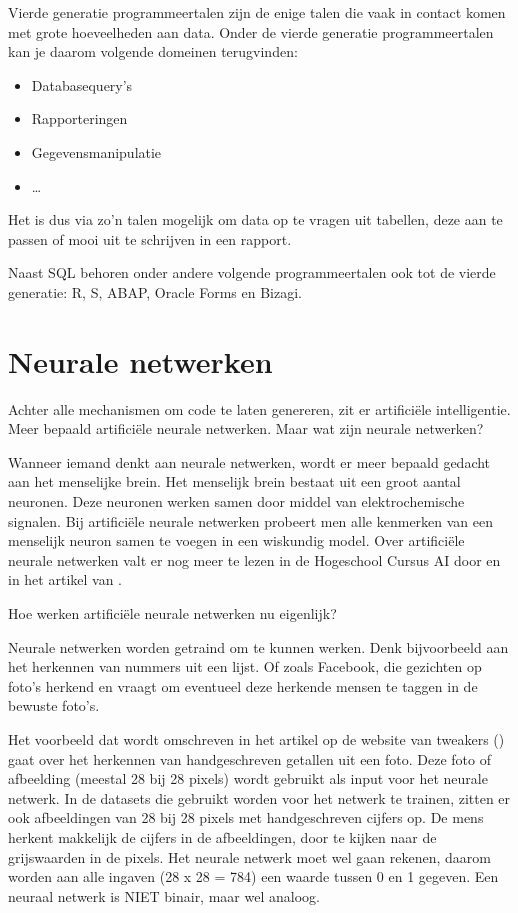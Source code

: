 Vierde generatie programmeertalen zijn de enige talen die vaak in contact komen met grote hoeveelheden aan data. Onder de vierde generatie programmeertalen kan je daarom volgende domeinen terugvinden:

\begin{itemize}
	\item Databasequery’s
	\item Rapporteringen
	\item Gegevensmanipulatie
	\item \dots
\end{itemize}

Het is dus via zo’n talen mogelijk om data op te vragen uit tabellen, deze aan te passen of mooi uit te schrijven in een rapport.

Naast SQL behoren onder andere volgende programmeertalen ook tot de vierde generatie: R, S, ABAP, Oracle Forms en Bizagi.

\section{Neurale netwerken}

Achter alle mechanismen om code te laten genereren, zit er artificiële intelligentie. Meer bepaald artificiële neurale netwerken. Maar wat zijn neurale netwerken? 

Wanneer iemand denkt aan neurale netwerken, wordt er meer bepaald gedacht aan het menselijke brein. Het menselijk brein bestaat uit een groot aantal neuronen. Deze neuronen werken samen door middel van elektrochemische signalen. Bij artificiële neurale netwerken probeert men alle kenmerken van een menselijk neuron samen te voegen in een wiskundig model. Over artificiële neurale netwerken valt er nog meer te lezen in de Hogeschool Cursus AI door \textcite{cursusAI} en in het artikel van \textcite{techpulse}.

Hoe werken artificiële neurale netwerken nu eigenlijk? 

Neurale netwerken worden getraind om te kunnen werken. Denk bijvoorbeeld aan het herkennen van nummers uit een lijst. Of zoals Facebook, die gezichten op foto’s herkend en vraagt om eventueel deze herkende mensen te taggen in de bewuste foto’s. 

Het voorbeeld dat wordt omschreven in het artikel op de website van tweakers (\textcite{tweakers}) gaat over het herkennen van handgeschreven getallen uit een foto. Deze foto of afbeelding (meestal 28 bij 28 pixels) wordt gebruikt als input voor het neurale netwerk. In de datasets die gebruikt worden voor het netwerk te trainen, zitten er ook afbeeldingen van 28 bij 28 pixels met handgeschreven cijfers op. De mens herkent makkelijk de cijfers in de afbeeldingen, door te kijken naar de grijswaarden in de pixels. Het neurale netwerk moet wel gaan rekenen, daarom worden aan alle ingaven (28 x 28 = 784) een waarde tussen 0 en 1 gegeven. Een neuraal netwerk is NIET binair, maar wel analoog. 

